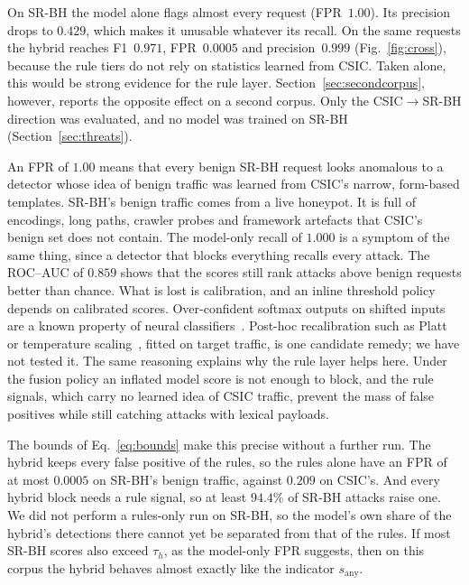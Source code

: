 \documentclass[preprint,11pt]{elsarticle}
\begin{document}
On SR-BH the model alone flags almost every request (FPR~$1.00$). Its
precision drops to $0.429$, which makes it unusable whatever its recall.
On the same requests the hybrid reaches F1~$0.971$, FPR~$0.0005$ and
precision~$0.999$ (Fig.~\ref{fig:cross}), because the rule tiers do not
rely on statistics learned from CSIC. Taken alone, this would be strong
evidence for the rule layer. Section~\ref{sec:secondcorpus}, however,
reports the opposite effect on a second corpus. Only the CSIC$\to$SR-BH
direction was evaluated, and no model was trained on SR-BH
(Section~\ref{sec:threats}).

An FPR of $1.00$ means that every benign SR-BH request looks anomalous to a
detector whose idea of benign traffic was learned from CSIC's narrow,
form-based templates. SR-BH's benign traffic comes from a live honeypot. It
is full of encodings, long paths, crawler probes and framework artefacts
that CSIC's benign set does not contain. The model-only recall of $1.000$
is a symptom of the same thing, since a detector that blocks everything
recalls every attack. The ROC--AUC of $0.859$ shows that the scores still
rank attacks above benign requests better than chance. What is lost is
calibration, and an inline threshold policy depends on calibrated scores.
Over-confident softmax outputs on shifted inputs are a known property of
neural classifiers~\cite{guo2017calibration,hendrycks2017baseline}.
Post-hoc recalibration such as Platt or temperature
scaling~\cite{platt1999probabilistic,guo2017calibration}, fitted on target
traffic, is one candidate remedy; we have not tested it. The same reasoning
explains why the rule layer helps here. Under the fusion policy an inflated
model score is not enough to block, and the rule signals, which carry no
learned idea of CSIC traffic, prevent the mass of false positives while
still catching attacks with lexical payloads.

The bounds of Eq.~\eqref{eq:bounds} make this precise without a further
run. The hybrid keeps every false positive of the rules, so the rules alone
have an FPR of at most $0.0005$ on SR-BH's benign traffic, against $0.209$
on CSIC's. And every hybrid block needs a rule signal, so at least $94.4\%$
of SR-BH attacks raise one. We did not perform a rules-only run on SR-BH,
so the model's own share of the hybrid's detections there cannot yet be
separated from that of the rules. If most SR-BH scores also exceed
$\tau_h$, as the model-only FPR suggests, then on this corpus the hybrid
behaves almost exactly like the indicator $s_{\text{any}}$.
\end{document}
